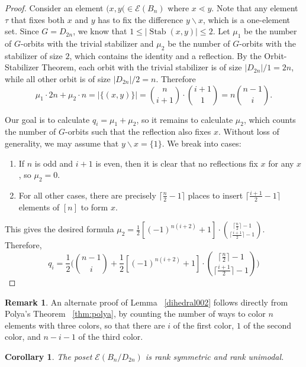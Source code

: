 \documentclass[10 pt]{amsart}
\theoremstyle{plain}
\newtheorem{cor}[thm]{Corollary}
\theoremstyle{definition}
\newtheorem{rem}[thm]{Remark}
\theoremstyle{remark}
\numberwithin{equation}{section}
\newcommand{\minus}{\backslash}
\newcommand{\dstyle}{\displaystyle}
\def\Stab{\operatorname{Stab}}
\begin{document}
\begin{proof}
Consider an element $(x , y( \in \mathcal E(B_n)$ where $x \lessdot y$. Note that any element $\tau $ that fixes both $x$ and $y$ has to fix the difference $y\minus x$, which is a one-element set. Since $G = D_{2n}$, 
we know that $1\leq |\Stab (x , y)| \leq 2$.   
Let $\mu_1$ be the number of $G$-orbits with the trivial stabilizer and $\mu_2$ be the number of $G$-orbits with the stabilizer of size $2$, which contains the identity and a reflection. By the Orbit-Stabilizer Theorem, each orbit with the trivial stabilizer is of size $|D_{2n}| /1 = 2n $, while all other orbit is of size $|D_{2n}|/2 = n$.  Therefore $$\mu_1 \cdot 2n + \mu_2 \cdot n = |\{(x, y)\}| = {n \choose {i+1}}  \cdot {{i+1} \choose 1} = n {n-1 \choose i }.$$

Our goal is to calculate $q_i = \mu_1 + \mu_2$, so it remains to calculate $\mu_2$, which counts the number of $G$-orbits such that the reflection also fixes $x$. Without loss of generality, we may assume that $y\minus x = \{1\}$. 
We break into cases:
\begin{enumerate}
\item If $n$ is odd and $i+1$ is even, then it is clear that no reflections fix $x$ for any $x$, so $\mu_2=0$. 
\item For all other cases, there are precisely $\lceil \frac n 2 -1\rceil$ places to insert $\lceil \frac {i+1} 2 - 1 \rceil$ elements of $[n]$ to form $x$. 
\end{enumerate}
This gives the desired formula $\dstyle \mu_2 =  \frac{1}{2} [(-1)^{n(i+2)}+1] \cdot { \lceil \frac n 2\rceil -1  \choose \lceil \frac{i+1} 2 \rceil - 1}   $. Therefore, 
$$q_i = \frac{1}{2} \Big( {n-1 \choose i } + \frac{1}{2} [(-1)^{n(i+2)}+1] \cdot { \lceil \frac n 2\rceil -1  \choose \lceil \frac{i+1} 2 \rceil - 1}    \Big)$$
\end{proof}
\begin{rem}
An alternate proof of Lemma ~\ref{dihedral002} follows directly from Polya's Theorem ~\ref{thm:polya}, by counting the number of ways to color $n$ elements with three colors, so that there are $i$ of the first color, $1$ of the second color, and $n-i-1$ of the third color.
\end{rem}

\begin{cor}{\label{dihedral003}} 
The poset $\mathcal E(B_n/D_{2n})$ is rank symmetric and rank unimodal.
\end{cor}
\end{document}
